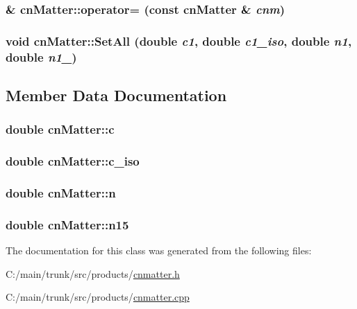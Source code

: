 \label{classcn_matter_a251b67b6dcfc44453c2806890d38930f}
\hypertarget{classcn_matter_ad3c60b93c3aba076b8f81de724198f31}{
\subsubsection[{operator=}]{ \& cnMatter::operator= (const {\bf cnMatter} \& {\em cnm})}}
\label{classcn_matter_ad3c60b93c3aba076b8f81de724198f31}
\hypertarget{classcn_matter_aaf59c0cd3ef2526a5a5e3e536ae3de46}{
\subsubsection[{SetAll}]{\setlength{\rightskip}{0pt plus 5cm}void cnMatter::SetAll (double {\em c1}, \/  double {\em c1\_\-iso}, \/  double {\em n1}, \/  double {\em n1\_})}}
\label{classcn_matter_aaf59c0cd3ef2526a5a5e3e536ae3de46}


\subsection{Member Data Documentation}
\hypertarget{classcn_matter_ad1d68c3a937d7111070aa0821c6c10f9}{
\subsubsection[{c}]{\setlength{\rightskip}{0pt plus 5cm}double {\bf cnMatter::c}}}
\label{classcn_matter_ad1d68c3a937d7111070aa0821c6c10f9}
\hypertarget{classcn_matter_ab65edcd54562238a4ca1e1c10e7abad1}{
\subsubsection[{c\_\-iso}]{\setlength{\rightskip}{0pt plus 5cm}double {\bf cnMatter::c\_\-iso}}}
\label{classcn_matter_ab65edcd54562238a4ca1e1c10e7abad1}
\hypertarget{classcn_matter_aeae2078338cb768beda7ab04d69a1479}{
\subsubsection[{n}]{\setlength{\rightskip}{0pt plus 5cm}double {\bf cnMatter::n}}}
\label{classcn_matter_aeae2078338cb768beda7ab04d69a1479}
\hypertarget{classcn_matter_a80822025457f202cd4199fb4a1a61ded}{
\subsubsection[{n15}]{\setlength{\rightskip}{0pt plus 5cm}double {\bf cnMatter::n15}}}
\label{classcn_matter_a80822025457f202cd4199fb4a1a61ded}


The documentation for this class was generated from the following files:\begin{DoxyCompactItemize}
\item 
C:/main/trunk/src/products/\hyperlink{cnmatter_8h}{cnmatter.h}\item 
C:/main/trunk/src/products/\hyperlink{cnmatter_8cpp}{cnmatter.cpp}\end{DoxyCompactItemize}
